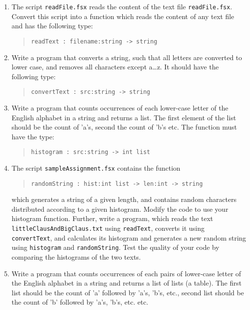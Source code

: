\begin{enumerate}
\item The script \lstinline[language=console]{readFile.fsx} reads the
  content of the text file
  \lstinline[language=console]{readFile.fsx}. Convert this script into
  a function which reads the content of any text file and has the
  following type:
  \begin{quote}
    \mbox{\lstinline!readText : filename:string -> string!}
  \end{quote}
\item Write a program that converts a string, such that all letters
  are converted to lower case, and removes all characters except
  a\ldots z. It should have the following type:
  \begin{quote}
    \mbox{\lstinline!convertText : src:string -> string!}
  \end{quote}
\item Write a program that counts occurrences of each lower-case letter
  of the English alphabet in a string and returns a list. The first
  element of the list should be the count of 'a's, second the count of
  'b's etc. The function must have the type:
  \begin{quote}
    \mbox{\lstinline!histogram : src:string -> int list!}
  \end{quote}
\item The script \lstinline[language=console]{sampleAssignment.fsx}
  contains the function
  \begin{quote}
    \mbox{\lstinline!randomString : hist:int list -> len:int -> string!}
  \end{quote}
  which generates a string of a given length, and contains
  random characters distributed according to a given histogram. Modify
  the code to use your histogram function. Further, write a program,
  which reads the text
  \lstinline[language=console]{littleClausAndBigClaus.txt} using
  \lstinline{readText}, converts it using \lstinline{convertText}, and
  calculates its histogram and generates a new random string using
  \lstinline{histogram} and \lstinline{randomString}.  Test the
  quality of your code by comparing the histograms of the two texts.
\item Write a program that counts occurrences of each pairs of
  lower-case letter of the English alphabet in a string and returns a
  list of lists (a table). The first list should be the count of 'a'
  followed by 'a's, 'b's, etc., second list should be the count of 'b'
  followed by 'a's, 'b's, etc. etc.
  \begin{quote}

\end{quote}
\end{enumerate}
